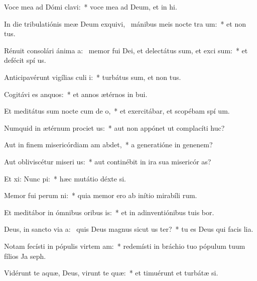 \item Voce mea ad Dómi clavi:~* voce mea ad Deum, et in hi.
\item In die tribulatiónis meæ Deum exquivi,~\pscross{} mánibus meis nocte tra um:~* et non  tus.
\item Rénuit consolári ánima a:~\pscross{} memor fui Dei, et delectátus sum, et exci sum:~* et defécit spí us.
\item Anticipavérunt vigílias culi i:~* turbátus sum, et non  tus.
\item Cogitávi es anquos:~* et annos ætérnos in  bui.
\item Et meditátus sum nocte cum de o,~* et exercitábar, et scopébam spí um.
\item Numquid in ætérnum prociet us:~* aut non appónet ut complacíti  huc?
\item Aut in finem misericórdiam am abdet,~* a generatióne in genenem?
\item Aut obliviscétur miseri us:~* aut continébit in ira sua misericór as?
\item Et xi: Nunc pi:~* hæc mutátio déxte si.
\item Memor fui perum ni:~* quia memor ero ab inítio mirabíli rum.
\item Et meditábor in ómnibus oribus is:~* et in adinventiónibus tuis bor.
\item Deus, in sancto via a:~\pscross{} quis Deus magnus sicut us ter?~* tu es Deus qui facis lia.
\item Notam fecísti in pópulis virtem am:~* redemísti in bráchio tuo pópulum tuum fílios Ja  seph.
\item Vidérunt te aquæ, Deus, virunt te quæ:~* et timuérunt et turbátæ  si.
